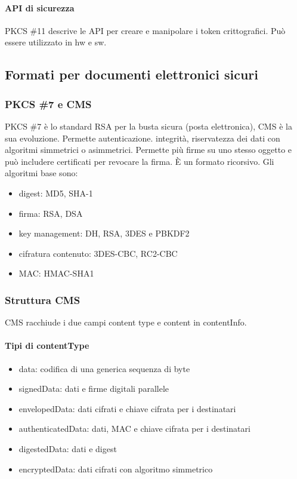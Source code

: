 \documentclass[11pt]{article}
\begin{document}
\paragraph*{API di sicurezza}
PKCS \#11 descrive le API per creare e manipolare i token crittografici. Può essere utilizzato in hw e sw.
\subsection{Formati per documenti elettronici sicuri}
\subsubsection{PKCS \#7 e CMS}
PKCS \#7 è lo standard RSA per la busta sicura (posta elettronica), CMS è la sua evoluzione. Permette autenticazione. integrità, riservatezza 
dei dati con algoritmi simmetrici o asimmetrici. Permette più firme su uno stesso oggetto e può includere certificati per 
revocare la firma. È un formato ricorsivo.
Gli algoritmi base sono:
\begin{itemize}
    \item digest: MD5, SHA-1
    \item firma: RSA, DSA 
    \item key management: DH, RSA, 3DES e PBKDF2
    \item cifratura contenuto: 3DES-CBC, RC2-CBC
    \item MAC: HMAC-SHA1
\end{itemize}
\subsubsection{Struttura CMS}
CMS racchiude i due campi content type e content in contentInfo.
\paragraph*{Tipi di contentType}
\begin{itemize}
    \item data: codifica di una generica sequenza di byte 
    \item signedData: dati e firme digitali parallele 
    \item envelopedData: dati cifrati e chiave cifrata per i destinatari 
    \item authenticatedData: dati, MAC e chiave cifrata per i destinatari 
    \item digestedData: dati e digest 
    \item encryptedData: dati cifrati con algoritmo simmetrico
\end{itemize}
\end{document}
